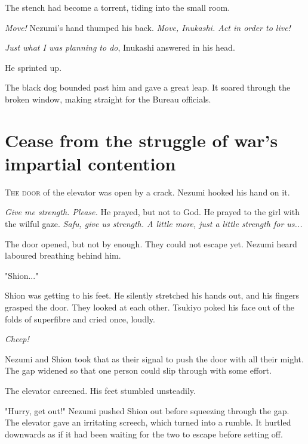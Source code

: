 The stench had become a torrent, tiding into the small room.

\emph{Move!} Nezumi's hand thumped his back. \emph{Move, Inukashi. Act in order to
	live!}

\emph{Just what I was planning to do}, Inukashi answered in his head.

He sprinted up.

The black dog bounded past him and gave a great leap. It soared through
the broken window, making straight for the Bureau officials.

\chapter{Cease from the struggle of war's impartial contention}


\lettrine{T}{he door} of the elevator was open by a crack. Nezumi hooked his hand on
it.

\emph{Give me strength. Please.} He prayed, but not to God. He prayed to the
girl with the wilful gaze. \emph{Safu, give us strength. A little more, just a
	little strength for us...}

The door opened, but not by enough. They could not escape yet. Nezumi
heard laboured breathing behind him.

"Shion..."

Shion was getting to his feet. He silently stretched his hands out, and
his fingers grasped the door. They looked at each other. Tsukiyo poked
his face out of the folds of superfibre and cried once, loudly.

\emph{Cheep!}

Nezumi and Shion took that as their signal to push the door with all
their might. The gap widened so that one person could slip through with
some effort.

The elevator careened. His feet stumbled unsteadily.

"Hurry, get out!" Nezumi pushed Shion out before squeezing through the
gap. The elevator gave an irritating screech, which turned into a
rumble. It hurtled downwards as if it had been waiting for the two to
escape before setting off.

